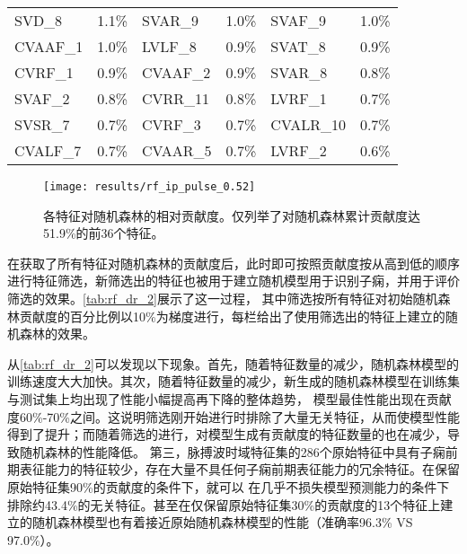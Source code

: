 \begin{center}
\begin{longtable}{m{2cm}<{\centering}m{2cm}<{\centering}m{2cm}<{\centering}m{2cm}<{\centering}m{2cm}<{\centering}m{2cm}<{\centering}}
            SVD\_8                           & 1.1\%                            & SVAR\_9                          & 1.0\%                            & SVAF\_9                          & 1.0\%                            \\
            CVAAF\_1                         & 1.0\%                            & LVLF\_8                          & 0.9\%                            & SVAT\_8                          & 0.9\%                            \\
            CVRF\_1                          & 0.9\%                            & CVAAF\_2                         & 0.9\%                            & SVAR\_8                          & 0.8\%                            \\
            SVAF\_2                          & 0.8\%                            & CVRR\_11                         & 0.8\%                            & LVRF\_1                          & 0.7\%                            \\
            SVSR\_7                          & 0.7\%                            & CVRF\_3                          & 0.7\%                            & CVALR\_10                        & 0.7\%                            \\
            CVALF\_7                         & 0.7\%                            & CVAAR\_5                         & 0.7\%                            & LVRF\_2                          & 0.6\%                           
      \end{longtable}
\end{center}

\begin{figure}[htbp]
      \centering
      \texttt{[image: results/rf\_ip\_pulse\_0.52]}
      \caption[各特征对随机森林的相对贡献度]{\label{fig:rf_importance_pulse}各特征对随机森林的相对贡献度。仅列举了对随机森林累计贡献度达51.9\%的前36个特征。}
\end{figure}

在获取了所有特征对随机森林的贡献度后，此时即可按照贡献度按从高到低的顺序进行特征筛选，新筛选出的特征也被用于建立随机模型用于识别子痫，并用于评价筛选的效果。\autoref{tab:rf_dr_2}展示了这一过程，
其中筛选按所有特征对初始随机森林贡献度的百分比例以10\%为梯度进行，每栏给出了使用筛选出的特征上建立的随机森林的效果。

从\autoref{tab:rf_dr_2}可以发现以下现象。首先，随着特征数量的减少，随机森林模型的训练速度大大加快。其次，随着特征数量的减少，新生成的随机森林模型在训练集与测试集上均出现了性能小幅提高再下降的整体趋势，
模型最佳性能出现在贡献度60\%-70\%之间。这说明筛选刚开始进行时排除了大量无关特征，从而使模型性能得到了提升；而随着筛选的进行，对模型生成有贡献度的特征数量的也在减少，导致随机森林的性能降低。
第三，脉搏波时域特征集的286个原始特征中具有子痫前期表征能力的特征较少，存在大量不具任何子痫前期表征能力的冗余特征。在保留原始特征集90\%的贡献度的条件下，就可以
在几乎不损失模型预测能力的条件下排除约43.4\%的无关特征。甚至在仅保留原始特征集30\%的贡献度的13个特征上建立的随机森林模型也有着接近原始随机森林模型的性能（准确率96.3\% VS 97.0\%）。

